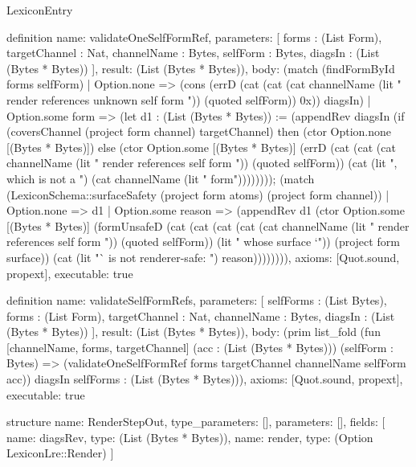 \begin{lexlean}{LexiconEntry}
\begin{semanticmodule}
definition{
  name: validateOneSelfFormRef,
  parameters: [
    forms : (List Form),
    targetChannel : Nat,
    channelName : Bytes,
    selfForm : Bytes,
    diagsIn : (List (Bytes * Bytes))
  ],
  result: (List (Bytes * Bytes)),
  body: (match (findFormById forms selfForm)
    | Option.none => (cons (errD (cat (cat (cat channelName (lit " render references unknown self form ")) (quoted selfForm)) 0x)) diagsIn)
    | Option.some form => (let d1 : (List (Bytes * Bytes)) := (appendRev diagsIn (if (coversChannel (project form channel) targetChannel) then (ctor Option.none [(Bytes * Bytes)]) else (ctor Option.some [(Bytes * Bytes)] (errD (cat (cat (cat channelName (lit " render references self form ")) (quoted selfForm)) (cat (lit ", which is not a ") (cat channelName (lit " form")))))))); (match (LexiconSchema::surfaceSafety (project form atoms) (project form channel))
      | Option.none => d1
      | Option.some reason => (appendRev d1 (ctor Option.some [(Bytes * Bytes)] (formUnsafeD (cat (cat (cat (cat (cat channelName (lit " render references self form ")) (quoted selfForm)) (lit " whose surface `")) (project form surface)) (cat (lit "` is not renderer-safe: ") reason)))))))),
  axioms: [Quot.sound, propext],
  executable: true
}

definition{
  name: validateSelfFormRefs,
  parameters: [
    selfForms : (List Bytes),
    forms : (List Form),
    targetChannel : Nat,
    channelName : Bytes,
    diagsIn : (List (Bytes * Bytes))
  ],
  result: (List (Bytes * Bytes)),
  body: (prim list_fold (fun [channelName, forms, targetChannel] (acc : (List (Bytes * Bytes))) (selfForm : Bytes) => (validateOneSelfFormRef forms targetChannel channelName selfForm acc)) diagsIn selfForms : (List (Bytes * Bytes))),
  axioms: [Quot.sound, propext],
  executable: true
}

structure{
  name: RenderStepOut,
  type_parameters: [],
  parameters: [],
  fields: [
    {name: diagsRev, type: (List (Bytes * Bytes))},
    {name: render, type: (Option LexiconLre::Render)}
  ]
}


\end{semanticmodule}
\end{lexlean}
